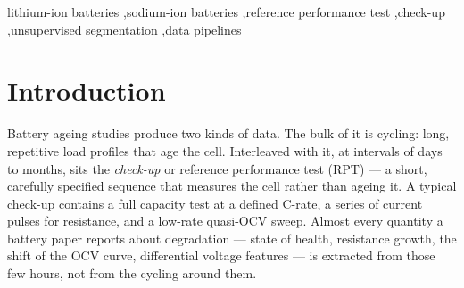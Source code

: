 \documentclass[preprint,3p,number]{elsarticle}
\begin{document}
\begin{frontmatter}
\begin{abstract}
fixed-current detector of the kind used to discard RPTs in existing pipelines
matches it on the chemistry it was calibrated for and finds nothing at all on
either unseen one. Under controlled folds the difference is attributable to the
label space rather than to the features: held-out capacity recall is
\SI{0}{\percent} when the capacity C-rate must be learned and \SI{100}{\percent}
when it is supplied as configuration, for every feature set tried. Fourth, on
\num{177} reference tests from two independent laboratories, given only their
published cell parameters and no target-laboratory labels, the parameterised
route recovers every capacity test. That experiment also exposed a latent defect
in the unsupervised route --- a cluster-selection rule our own protocols can
never reach, which cost \SI{90}{\percent} of one laboratory's capacity tests
until corrected --- illustrating that cross-laboratory validation tests the
implementation as much as the generalisation. Finally, applying the method to the
opportunistic charging records of \num{20} on-road electric vehicles --- data
with no protocol at all --- recovers a consistent near-full-charge population
and reduces the scatter of capacity estimates about their ageing trend by a
factor of \num{1.71} on every vehicle, which demonstrates the reach of the
description while marking where the parameterised step stops applying.
\end{abstract}

\begin{keyword}
lithium-ion batteries \sep sodium-ion batteries \sep reference performance test
\sep check-up \sep unsupervised segmentation \sep data pipelines
\end{keyword}

\end{frontmatter}

\section{Introduction}
\label{sec:intro}

Battery ageing studies produce two kinds of data. The bulk of it is cycling:
long, repetitive load profiles that age the cell. Interleaved with it, at
intervals of days to months, sits the \emph{check-up} or reference performance
test (RPT) --- a short, carefully specified sequence that measures the cell
rather than ageing it. A typical check-up contains a full capacity test at a
defined C-rate, a series of current pulses for resistance, and a low-rate
quasi-OCV sweep. Almost every quantity a battery paper reports about degradation
--- state of health, resistance growth, the shift of the OCV curve, differential
voltage features --- is extracted from those few hours, not from the cycling
around them.
\end{document}
